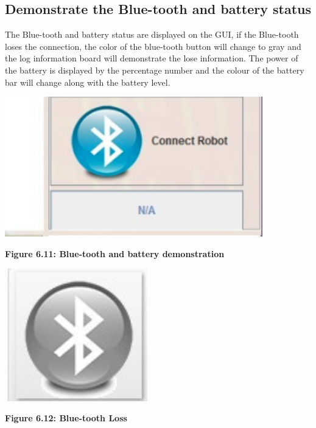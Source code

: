 \documentclass[11pt, a4paper]{report}
\begin{document}
\subsection{Demonstrate the Blue-tooth and battery status}
The Blue-tooth and battery status are displayed on the GUI, if the Blue-tooth loses the connection, the color of the blue-tooth button will change to gray and the log information board will demonstrate the lose information. The power of the battery is displayed by the percentage number and the colour of the battery bar will change along with the battery level.
 \begin{center}
 \includegraphics[width=11.20cm]{bluetooth_battery}
\end{center}
\begin{center}
\textbf {Figure 6.11: Blue-tooth and battery demonstration } \\[0.3cm]
\end{center}
 \begin{center}
 \includegraphics[width=6.20cm]{connectionloss.jpg}
\end{center}
\begin{center}
\textbf {Figure 6.12: Blue-tooth Loss } \\[0.3cm]
\end{center}
\end{document}
